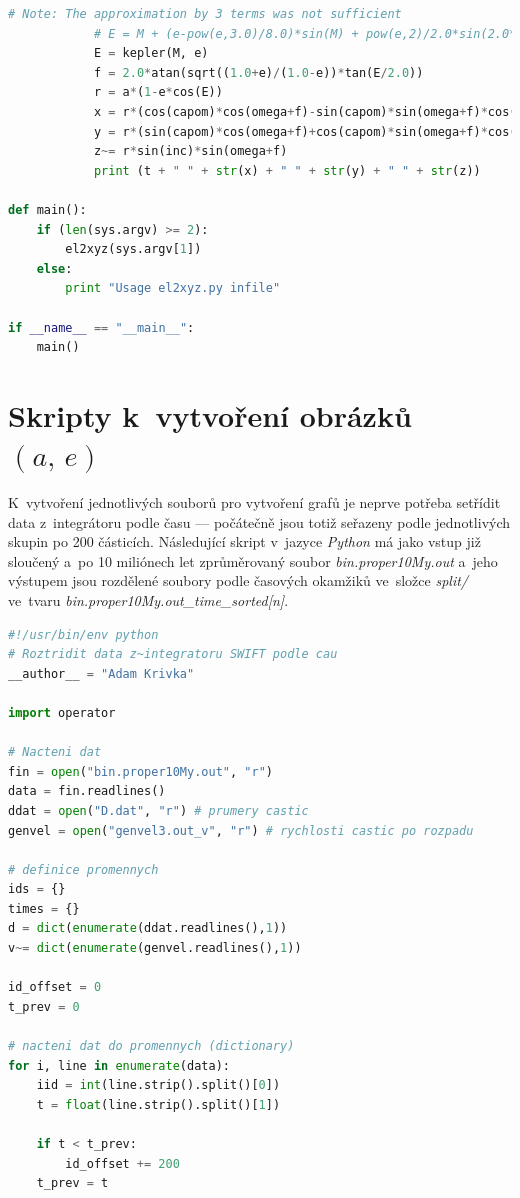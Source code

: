 \documentclass[A4paper, 12pt, oneside, openany]{book}
\begin{document}
\begin{appendices}
\begin{lstlisting}[language=Python]
            # Note: The approximation by 3 terms was not sufficient
            # E = M + (e-pow(e,3.0)/8.0)*sin(M) + pow(e,2)/2.0*sin(2.0*M) + pow(e,3)*3.0/8.0*sin(3.0*M)
            E = kepler(M, e)
            f = 2.0*atan(sqrt((1.0+e)/(1.0-e))*tan(E/2.0))
            r = a*(1-e*cos(E))
            x = r*(cos(capom)*cos(omega+f)-sin(capom)*sin(omega+f)*cos(inc))
            y = r*(sin(capom)*cos(omega+f)+cos(capom)*sin(omega+f)*cos(inc))
            z~= r*sin(inc)*sin(omega+f)
            print (t + " " + str(x) + " " + str(y) + " " + str(z))

def main():
    if (len(sys.argv) >= 2):
        el2xyz(sys.argv[1])
    else:
        print "Usage el2xyz.py infile"

if __name__ == "__main__":
    main()
	\end{lstlisting}

	\chapter{Skripty k~vytvoření obrázků $(a,\,e)$} \label{app:fig:ae_sim}
	K~vytvoření jednotlivých souborů pro vytvoření grafů je neprve potřeba setřídit data z~integrátoru podle času --- počátečně jsou totiž seřazeny podle jednotlivých skupin po 200 částicích. Následující skript v~jazyce \textit{Python} má jako vstup již sloučený a~po 10 miliónech let zprůměrovaný soubor \textit{bin.proper10My.out} a~jeho výstupem jsou rozdělené soubory podle časových okamžiků ve~složce \textit{split/} ve~tvaru \textit{bin.proper10My.out\_time\_sorted[n]}.
	\begin{lstlisting}[language=Python]
#!/usr/bin/env python
# Roztridit data z~integratoru SWIFT podle cau
__author__ = "Adam Krivka"

import operator

# Nacteni dat
fin = open("bin.proper10My.out", "r")
data = fin.readlines()
ddat = open("D.dat", "r") # prumery castic
genvel = open("genvel3.out_v", "r") # rychlosti castic po rozpadu

# definice promennych
ids = {}
times = {}
d = dict(enumerate(ddat.readlines(),1))
v~= dict(enumerate(genvel.readlines(),1))

id_offset = 0
t_prev = 0

# nacteni dat do promennych (dictionary)
for i, line in enumerate(data):
    iid = int(line.strip().split()[0])
    t = float(line.strip().split()[1])

    if t < t_prev:
        id_offset += 200
    t_prev = t


\end{lstlisting}
\end{appendices}
\end{document}
